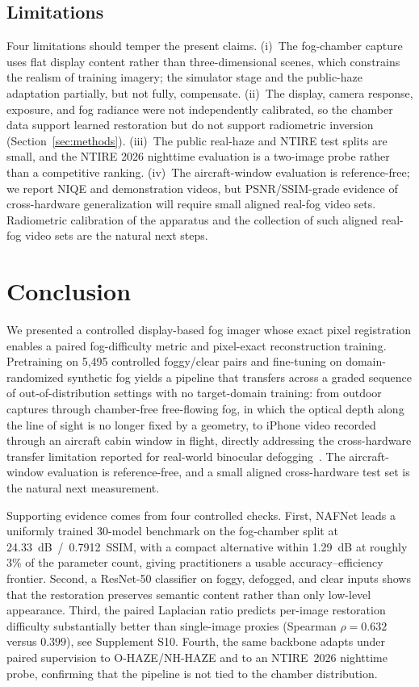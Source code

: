\documentclass{optica-article}
\begin{document}
\subsection{Limitations}
\label{sec:limitations}
Four limitations should temper the present claims. (i)~The
fog-chamber capture uses flat display content rather than
three-dimensional scenes, which constrains the realism of training
imagery; the simulator stage and the public-haze adaptation
partially, but not fully, compensate. (ii)~The display, camera
response, exposure, and fog radiance were not independently
calibrated, so the chamber data support learned restoration but do
not support radiometric inversion (Section~\ref{sec:methods}).
(iii)~The public real-haze and NTIRE test splits are small, and
the NTIRE 2026 nighttime evaluation is a two-image probe rather
than a competitive ranking. (iv)~The aircraft-window evaluation
is reference-free; we report NIQE and demonstration videos, but
PSNR/SSIM-grade evidence of cross-hardware generalization will
require small aligned real-fog video sets. Radiometric calibration
of the apparatus and the collection of such aligned real-fog video
sets are the natural next steps.
 
\section{Conclusion}
\label{sec:conclusion}

We presented a controlled display-based fog imager whose exact pixel
registration enables a paired fog-difficulty metric and pixel-exact
reconstruction training. Pretraining on 5{,}495 controlled foggy/clear
pairs and fine-tuning on domain-randomized synthetic fog yields a
pipeline that transfers across a graded sequence of out-of-distribution
settings with no target-domain training: from outdoor captures through
chamber-free free-flowing fog, in which the optical depth along the
line of sight is no longer fixed by a geometry, to iPhone video
recorded through an aircraft cabin window in flight, directly
addressing the cross-hardware transfer limitation reported for
real-world binocular defogging~\cite{pollak2024stereofog}. The
aircraft-window evaluation is reference-free, and a small aligned
cross-hardware test set is the natural next measurement.

Supporting evidence comes from four controlled checks. First, NAFNet
leads a uniformly trained 30-model benchmark on the fog-chamber split
at 24.33~dB~/~0.7912~SSIM, with a compact alternative within 1.29~dB
at roughly 3\% of the parameter count, giving practitioners a usable
accuracy--efficiency frontier. Second, a ResNet-50 classifier on
foggy, defogged, and clear inputs shows that the restoration
preserves semantic content rather than only low-level appearance.
Third, the paired Laplacian ratio predicts per-image restoration
difficulty substantially better than single-image proxies
(Spearman $\rho = 0.632$ versus $0.399$), see Supplement S10. Fourth, the same backbone adapts under paired supervision to O-HAZE/NH-HAZE and to an NTIRE~2026
nighttime probe, confirming that the pipeline is not tied to the
chamber distribution.
\end{document}
